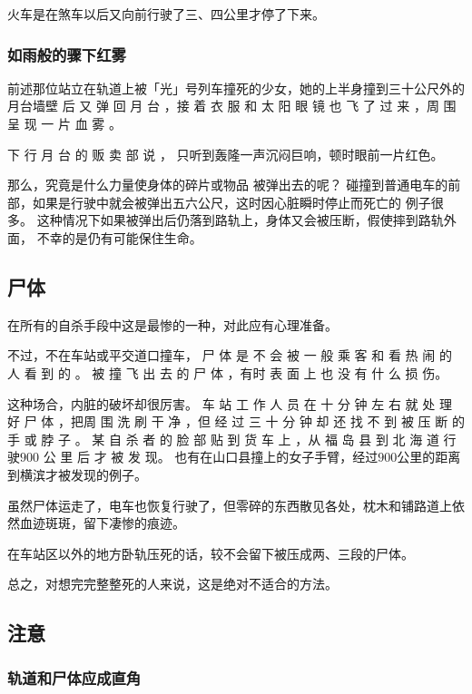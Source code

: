 \documentclass[UTF8]{ctexart}
\begin{document}
火车是在煞车以后又向前行驶了三、四公里才停了下来。 

\subsubsection*{如雨般的骤下红雾}

前述那位站立在轨道上被「光」号列车撞死的少女，她的上半身撞到三十公尺外的月台墙壁 后 又 弹 回 月 台 ，接 着 衣 服 和 太 阳 眼 镜 也 飞 了 过 来 ，周 围 呈 现 一 片 血 雾 。

下 行 月 台 的 贩 卖 部 说 ， 只听到轰隆一声沉闷巨响，顿时眼前一片红色。

那么，究竟是什么力量使身体的碎片或物品 被弹出去的呢？ 碰撞到普通电车的前部，如果是行驶中就会被弹出五六公尺，这时因心脏瞬时停止而死亡的 例子很多。
这种情况下如果被弹出后仍落到路轨上，身体又会被压断，假使摔到路轨外面， 不幸的是仍有可能保住生命。

\subsection{尸体}

在所有的自杀手段中这是最惨的一种，对此应有心理准备。

不过，不在车站或平交道口撞车， 尸 体 是 不 会 被 一 般 乘 客 和 看 热 闹 的 人 看 到 的 。
被 撞 飞 出 去 的 尸 体 ，有时 表 面 上 也 没 有 什 么 损 伤。

这种场合，内脏的破坏却很厉害。 
车 站 工 作 人 员 在 十 分 钟 左 右 就 处 理 好 尸 体 ，把周 围 洗 刷 干 净 ，但 经 过 三 十 分 钟 却 还 找 不 到 被 压 断 的 手 或 脖 子 。
某 自 杀 者 的 脸 部 贴 到 货 车 上 ，从 福 岛 县 到 北 海 道 行 驶$900$ 公 里 后 才 被 发 现。
也有在山口县撞上的女子手臂，经过$900$公里的距离到横滨才被发现的例子。 

虽然尸体运走了，电车也恢复行驶了，但零碎的东西散见各处，枕木和铺路道上依然血迹斑斑，留下凄惨的痕迹。

在车站区以外的地方卧轨压死的话，较不会留下被压成两、三段的尸体。

总之，对想完完整整死的人来说，这是绝对不适合的方法。

\subsection{注意}

\subsubsection*{轨道和尸体应成直角}
\end{document}

